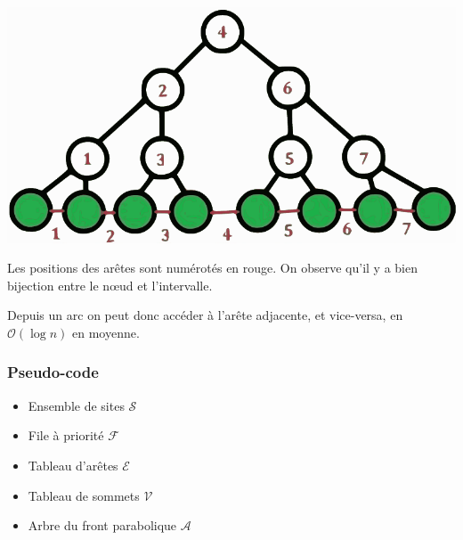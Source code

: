 \documentclass[a4paper, 10pt]{article}
\begin{document}
\begin{center}
\includegraphics[scale=0.4]{ArbreBinaire-vect.pdf}  
  
Les positions des arêtes sont numérotés en rouge. On observe qu'il y a bien bijection entre le nœud et l'intervalle.  
\end{center}
  
Depuis un arc on peut donc accéder à l'arête adjacente, et vice-versa, en $\mathcal{O}(\log{n})$ en moyenne.    
  
\subsubsection{Pseudo-code}  
\begin{itemize}
\item Ensemble de sites $\mathcal{S}$
\item File à priorité $\mathcal{F}$
\item Tableau d'arêtes $\mathcal{E}$
\item Tableau de sommets $\mathcal{V}$
\item Arbre du front parabolique $\mathcal{A}$
\end{itemize}
\end{document}
